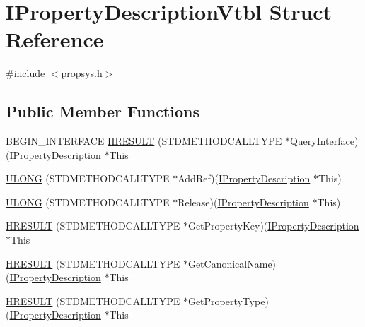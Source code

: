 \hypertarget{struct_i_property_description_vtbl}{}\section{I\+Property\+Description\+Vtbl Struct Reference}
\label{struct_i_property_description_vtbl}


{\ttfamily \#include $<$propsys.\+h$>$}

\subsection*{Public Member Functions}
\begin{DoxyCompactItemize}
\item 
B\+E\+G\+I\+N\+\_\+\+I\+N\+T\+E\+R\+F\+A\+CE \hyperlink{struct_i_property_description_vtbl_a46535b69a6533ac125c43a9baf34570d}{H\+R\+E\+S\+U\+LT} (S\+T\+D\+M\+E\+T\+H\+O\+D\+C\+A\+L\+L\+T\+Y\+PE $\ast$Query\+Interface)(\hyperlink{propsys_8h_a9dea4496617289c54b3e67bc2a0e8eca}{I\+Property\+Description} $\ast$This
\item 
\hyperlink{struct_i_property_description_vtbl_a49642e89353eb4aa5741017e0cfee703}{U\+L\+O\+NG} (S\+T\+D\+M\+E\+T\+H\+O\+D\+C\+A\+L\+L\+T\+Y\+PE $\ast$Add\+Ref)(\hyperlink{propsys_8h_a9dea4496617289c54b3e67bc2a0e8eca}{I\+Property\+Description} $\ast$This)
\item 
\hyperlink{struct_i_property_description_vtbl_a4f15b2282336e460f8733c1e8fe8f0be}{U\+L\+O\+NG} (S\+T\+D\+M\+E\+T\+H\+O\+D\+C\+A\+L\+L\+T\+Y\+PE $\ast$Release)(\hyperlink{propsys_8h_a9dea4496617289c54b3e67bc2a0e8eca}{I\+Property\+Description} $\ast$This)
\item 
\hyperlink{struct_i_property_description_vtbl_a7149cfc0c2cd302dbe316cff34933948}{H\+R\+E\+S\+U\+LT} (S\+T\+D\+M\+E\+T\+H\+O\+D\+C\+A\+L\+L\+T\+Y\+PE $\ast$Get\+Property\+Key)(\hyperlink{propsys_8h_a9dea4496617289c54b3e67bc2a0e8eca}{I\+Property\+Description} $\ast$This
\item 
\hyperlink{struct_i_property_description_vtbl_a52109e392fdaec4d91ba5b2b0a332a04}{H\+R\+E\+S\+U\+LT} (S\+T\+D\+M\+E\+T\+H\+O\+D\+C\+A\+L\+L\+T\+Y\+PE $\ast$Get\+Canonical\+Name)(\hyperlink{propsys_8h_a9dea4496617289c54b3e67bc2a0e8eca}{I\+Property\+Description} $\ast$This
\item 
\hyperlink{struct_i_property_description_vtbl_ac52b5c9f6aa94e944aac94d9319330aa}{H\+R\+E\+S\+U\+LT} (S\+T\+D\+M\+E\+T\+H\+O\+D\+C\+A\+L\+L\+T\+Y\+PE $\ast$Get\+Property\+Type)(\hyperlink{propsys_8h_a9dea4496617289c54b3e67bc2a0e8eca}{I\+Property\+Description} $\ast$This

\end{DoxyCompactItemize}
